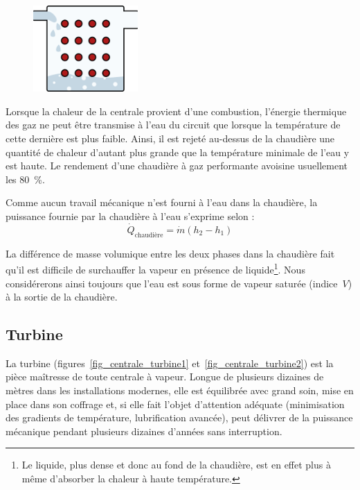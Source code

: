 		\begin{figure}
			\begin{center}
				\includegraphics[width=4cm]{images/symbole_chaudiere.png}
			\end{center}
			\label{fig_centrale_chaudiere2}
		\end{figure}
		
		Lorsque la chaleur de la centrale provient d’une combustion, l’énergie thermique des gaz ne peut être transmise à l’eau du circuit que lorsque la température de cette dernière est plus faible. Ainsi, il est rejeté au-dessus de la chaudière une quantité de chaleur d’autant plus grande que la température minimale de l’eau y est haute. Le rendement d’une chaudière à gaz performante avoisine usuellement les \SI{80}{\percent}.

		Comme aucun travail mécanique n’est fourni à l’eau dans la chaudière, la puissance fournie par la chaudière à l’eau s’exprime selon :
		\begin{equation}
			\dot{Q}_\text{chaudière} = \dot{m} (h_2 - h_1)
		\end{equation}

		La différence de masse volumique entre les deux phases dans la chaudière fait qu’il est difficile de surchauffer la vapeur en présence de liquide\footnote{Le liquide, plus dense et donc au fond de la chaudière, est en effet plus à même d’absorber la chaleur à haute température.}\nolinebreak.
		Nous considérerons ainsi toujours que l’eau est sous forme de vapeur saturée (indice~$V$) à la sortie de la chaudière.

	\subsection{Turbine}

		La turbine (figures~\ref{fig_centrale_turbine1} et~\ref{fig_centrale_turbine2}) est la pièce maîtresse de toute centrale à vapeur. Longue de plusieurs dizaines de mètres dans les installations modernes, elle est équilibrée avec grand soin, mise en place dans son coffrage et, si elle fait l’objet d’attention adéquate (minimisation des gradients de température, lubrification avancée), peut délivrer de la puissance mécanique pendant plusieurs dizaines d’années sans interruption.

